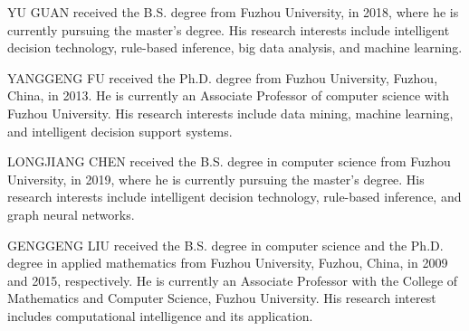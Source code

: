 \documentclass{ieeeaccess}
\begin{document}
\begin{IEEEbiography}{YU GUAN}
    received the B.S. degree from Fuzhou University, in 2018, where he is currently pursuing the master’s degree.
    His research interests include intelligent decision technology, rule-based inference, big data analysis, and machine learning.
\end{IEEEbiography}
\begin{IEEEbiography}{YANGGENG FU}
    received the Ph.D. degree from Fuzhou University, Fuzhou, China, in 2013.
    He is currently an Associate Professor of computer science with Fuzhou University. His research interests include data mining, machine learning, and intelligent decision support systems.
\end{IEEEbiography}
\begin{IEEEbiography}{LONGJIANG CHEN}
    received the B.S. degree in computer science from Fuzhou University, in 2019, where he is currently pursuing the master's degree. His research interests include intelligent decision technology, rule-based inference, and graph neural networks.
\end{IEEEbiography}
\begin{IEEEbiography}{GENGGENG LIU}
    received the B.S. degree in computer science and the Ph.D. degree in applied mathematics from Fuzhou University, Fuzhou, China, in 2009 and 2015, respectively.
    He is currently an Associate Professor with the College of Mathematics and Computer Science, Fuzhou University.
    His research interest includes computational intelligence and its application.
\end{IEEEbiography}
\end{document}

